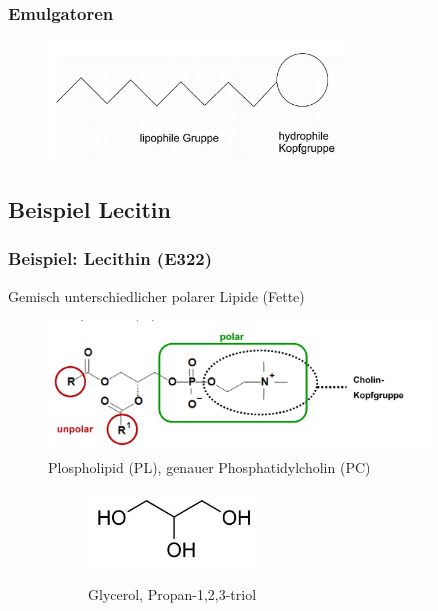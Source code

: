 \documentclass{beamer} %
\begin{document}
\begin{frame}
\frametitle{Emulgatoren}
\begin{figure}
\centering
\includegraphics[width = 0.7\textwidth]{EmulgatorAllgemein.JPG}
\end{figure}
\end{frame}

\subsection{Beispiel Lecitin}

\begin{frame}
\frametitle{Beispiel: Lecithin (E322)}
\begin{block}{}
Gemisch unterschiedlicher polarer Lipide (Fette)
\end{block}
\begin{figure}
\centering
\includegraphics[width = 0.9\textwidth]{Lecithin.JPG}
\caption{Plospholipid (PL), genauer Phosphatidylcholin (PC) }
\end{figure}
\pause
\begin{figure}[H]
\centering
\begin{subfigure}[c]{0.5\textwidth}
\centering
\includegraphics[width = 0.5\textwidth]{glycerol.jpg}
\end{subfigure}
\begin{subfigure}[c]{0.45\textwidth}
\centering
Glycerol, Propan-1,2,3-triol
\end{subfigure}
\end{figure}
\end{frame}
\end{document}
